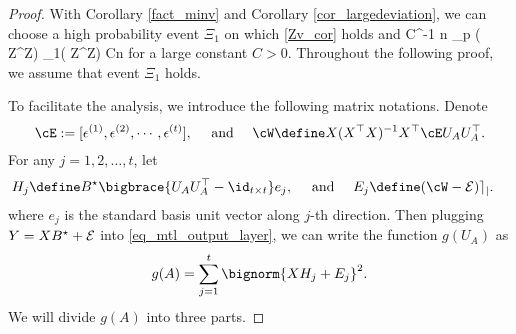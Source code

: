 \documentclass[aos,preprint]{imsart}
\begin{document}
	\begin{proof} %
	With Corollary \ref{fact_minv} and Corollary \ref{cor_largedeviation}, we can choose a high probability event $\Xi_1$ on which \eqref{Zv_cor} holds and 
\be\label{Op_norm3}
C^{-1} n \le \lambda_p ( Z^\top Z)  \le  \lambda_1( Z^\top  Z) \le Cn
\ee
for a large constant $C>0$. Throughout the following proof, we assume that event $\Xi_1$ holds.

	
	To facilitate the analysis, we introduce the following matrix notations.
	Denote
\[\cE  :=[\epsilon^{(1)},\epsilon^{(2)},\cdots, \epsilon^{(t)}],  \quad \text{ and } \quad \cW \define X(X^{\top} X)^{-1} X^{\top} \cE U_AU_A^\top. \]
	For any $j = 1,2,\dots, t$, let
	\begin{align}\label{defnHj}
		H_j &\define  B^{\star} \bigbrace{U_{A} U_{A}^{\top} - \id_{t\times t}}e_j , \quad \text{ and } \quad E_j \define (\cW -\cal E)e_j .
	\end{align}
	where $e_j$ is the standard basis unit vector along $j$-th direction. 
	Then plugging $Y=XB^\star + \cal E$ into \eqref{eq_mtl_output_layer}, we can write the function $g(U_A)$   as
	\[ g(A) = \sum_{j=1}^t \bignorm{X H_j + E_j}^2. \]
	We will divide $g(A)$ into three parts.


\end{proof}
\end{document}
